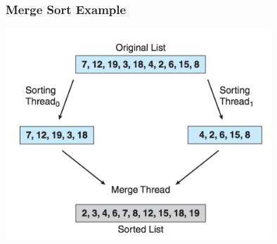 \begin{frame}
	\frametitle{Merge Sort Example}

	\begin{center}
		\includegraphics[width=0.75\textwidth]{images/multithread-sort.png}
	\end{center}


\end{frame}




